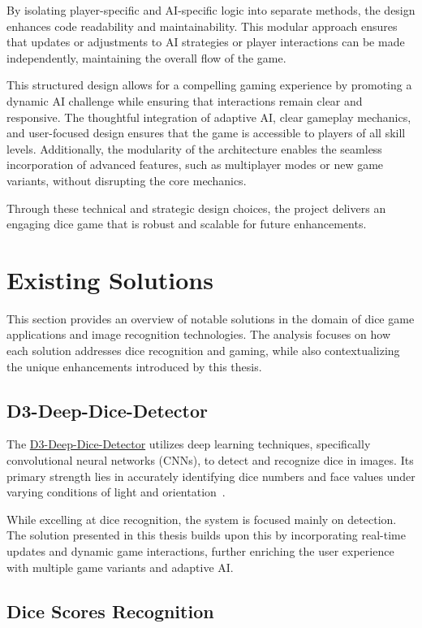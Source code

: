 By isolating player-specific and AI-specific logic into separate methods, the design enhances code readability and maintainability. This modular approach ensures that updates or adjustments to AI strategies or player interactions can be made independently, maintaining the overall flow of the game.

This structured design allows for a compelling gaming experience by promoting a dynamic AI challenge while ensuring that interactions remain clear and responsive. The thoughtful integration of adaptive AI, clear gameplay mechanics, and user-focused design ensures that the game is accessible to players of all skill levels. Additionally, the modularity of the architecture enables the seamless incorporation of advanced features, such as multiplayer modes or new game variants, without disrupting the core mechanics.

Through these technical and strategic design choices, the project delivers an engaging dice game that is robust and scalable for future enhancements.


\section{Existing Solutions}
This section provides an overview of notable solutions in the domain of dice game applications and image recognition technologies. The analysis focuses on how each solution addresses dice recognition and gaming, while also contextualizing the unique enhancements introduced by this thesis.

\subsection{D3-Deep-Dice-Detector}

The \href{https://github.com/harshmunshi/D3-Deep-Dice-Detector}{D3-Deep-Dice-Detector} utilizes deep learning techniques, specifically convolutional neural networks (CNNs), to detect and recognize dice in images. Its primary strength lies in accurately identifying dice numbers and face values under varying conditions of light and orientation~\cite{bib:D3-Dice}.

While excelling at dice recognition, the system is focused mainly on detection. The solution presented in this thesis builds upon this by incorporating real-time updates and dynamic game interactions, further enriching the user experience with multiple game variants and adaptive AI.

\subsection{Dice Scores Recognition}

